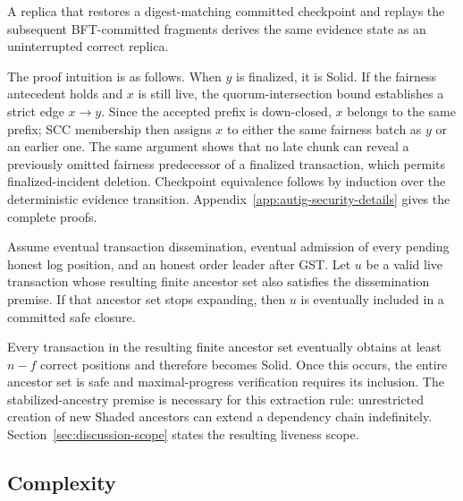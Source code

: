 \begin{theorem}
\label{thm:recovery}
A replica that restores a digest-matching committed checkpoint and replays the
subsequent BFT-committed fragments derives the same evidence state as an
uninterrupted correct replica.
\end{theorem}

The proof intuition is as follows.  When $y$ is finalized, it is Solid.  If
the fairness antecedent holds and $x$ is still live, the quorum-intersection
bound establishes a strict edge $x\to y$.  Since the accepted prefix is
down-closed, $x$ belongs to the same prefix; SCC membership then assigns $x$
to either the same fairness batch as $y$ or an earlier one.  The same argument
shows that no late chunk can reveal a previously omitted fairness predecessor
of a finalized transaction, which permits finalized-incident deletion.
Checkpoint equivalence follows by induction over the deterministic evidence
transition.  Appendix~\ref{app:autig-security-details} gives the complete
proofs.

\begin{proposition}
\label{prop:stabilized-progress}
Assume eventual transaction dissemination, eventual admission of every
pending honest log position, and an honest order leader after GST.  Let $u$ be
a valid live transaction whose resulting finite ancestor set also satisfies
the dissemination premise.  If that ancestor set stops expanding, then $u$ is
eventually included in a committed safe closure.
\end{proposition}

Every transaction in the resulting finite ancestor set eventually obtains at
least $n-f$ correct positions and therefore becomes Solid.  Once this occurs,
the entire ancestor set is safe and maximal-progress verification requires its
inclusion.  The stabilized-ancestry premise is necessary for this extraction
rule: unrestricted creation of new Shaded ancestors can extend a dependency
chain indefinitely.  Section~\ref{sec:discussion-scope} states the resulting
liveness scope.

\subsection{Complexity}
\label{sec:complexity}

